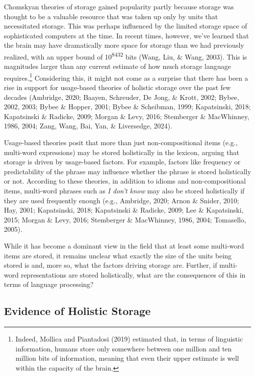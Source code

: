 \documentclass[
  man,floatsintext]{apa6}
\begin{document}
Chomskyan theories of storage gained popularity partly because storage was thought to be a valuable resource that was taken up only by units that necessitated storage. This was perhaps influenced by the limited storage space of sophisticated computers at the time. In recent times, however, we've learned that the brain may have dramatically more space for storage than we had previously realized, with an upper bound of 10\textsuperscript{8432} bits (Wang, Liu, \& Wang, 2003). This is magnitudes larger than any current estimate of how much storage language requires.\footnote{Indeed, Mollica and Piantadosi (2019) estimated that, in terms of linguistic information, humans store only somewhere between one million and ten million bits of information, meaning that even their upper estimate is well within the capacity of the brain.} Considering this, it might not come as a surprise that there has been a rise in support for usage-based theories of holistic storage over the past few decades (Ambridge, 2020; Baayen, Schreuder, De Jong, \& Krott, 2002; Bybee, 2002, 2003; Bybee \& Hopper, 2001; Bybee \& Scheibman, 1999; Kapatsinski, 2018; Kapatsinski \& Radicke, 2009; Morgan \& Levy, 2016; Stemberger \& MacWhinney, 1986, 2004; Zang, Wang, Bai, Yan, \& Liversedge, 2024).

Usage-based theories posit that more than just non-compositional items (e.g., multi-word expressions) may be stored holistically in the lexicon, arguing that storage is driven by usage-based factors. For example, factors like frequency or predictability of the phrase may influence whether the phrase is stored holistically or not. According to these theories, in addition to idioms and non-compositional items, multi-word phrases such as \emph{I don't know} may also be stored holistically if they are used frequently enough (e.g., Ambridge, 2020; Arnon \& Snider, 2010; Hay, 2001; Kapatsinski, 2018; Kapatsinski \& Radicke, 2009; Lee \& Kapatsinski, 2015; Morgan \& Levy, 2016; Stemberger \& MacWhinney, 1986, 2004; Tomasello, 2005).

While it has become a dominant view in the field that at least some multi-word items are stored, it remains unclear what exactly the size of the units being stored is and, more so, what the factors driving storage are. Further, if multi-word representations are stored holistically, what are the consequences of this in terms of language processing?

\hypertarget{evidence-of-holistic-storage}{%
\subsection{Evidence of Holistic Storage}\label{evidence-of-holistic-storage}}
\end{document}
